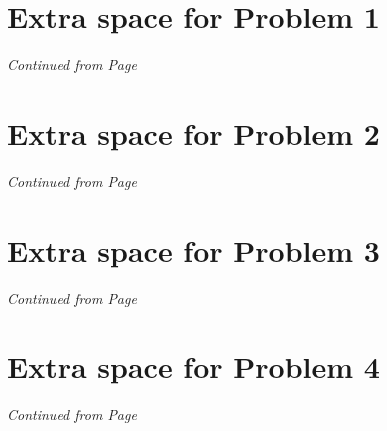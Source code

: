 \documentclass[11pt]{article}
\begin{document}
\newpage
  
\section*{Extra space for Problem 1}
\emph{Continued from Page \pageref{pg:end-of-p1}}


\label{pg:p1-continuation}
 
 
\newpage
 
 
\section*{Extra space for Problem 2}
\emph{Continued from Page \pageref{pg:end-of-p2}}

 
\label{pg:p2-continuation}
\newpage

 
\section*{Extra space for Problem 3}
\emph{Continued from Page \pageref{pg:end-of-p3}}
 
\label{pg:p3-continuation}

\newpage

\section*{Extra space for Problem 4}
\emph{Continued from Page \pageref{pg:end-of-p4}}
\end{document}

